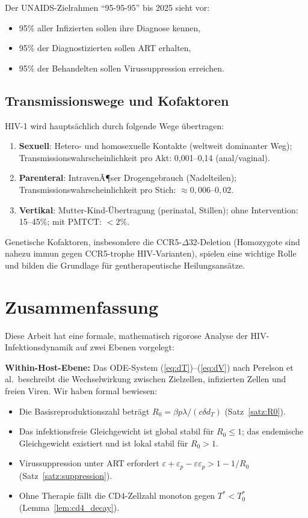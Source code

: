 ﻿\documentclass[a4paper,12pt]{article}
\theoremstyle{definition}
\begin{document}
Der UNAIDS-Zielrahmen ``95-95-95'' bis 2025 sieht vor:
\begin{itemize}
\item 95\% aller Infizierten sollen ihre Diagnose kennen,
\item 95\% der Diagnostizierten sollen ART erhalten,
\item 95\% der Behandelten sollen Virussuppression erreichen.
\end{itemize}

\subsection{Transmissionswege und Kofaktoren}

HIV-1 wird haupts\"achlich durch folgende Wege \"ubertragen:
\begin{enumerate}
\item \textbf{Sexuell}: Hetero- und homosexuelle Kontakte (weltweit dominanter Weg);
      Transmissionswahrscheinlichkeit pro Akt: 0{,}001--0{,}14 (anal/vaginal).
\item \textbf{Parenteral}: IntravenÃ¶ser Drogengebrauch (Nadelteilen);
      Transmissionswahrscheinlichkeit pro Stich: $\approx 0{,}006$--$0{,}02$.
\item \textbf{Vertikal}: Mutter-Kind-\"Ubertragung (perinatal, Stillen);
      ohne Intervention: 15--45\%; mit PMTCT: $< 2\%$.
\end{enumerate}

Genetische Kofaktoren, insbesondere die CCR5-$\Delta$32-Deletion (Homozygote
sind nahezu immun gegen CCR5-trophe HIV-Varianten), spielen eine wichtige Rolle
und bilden die Grundlage f\"ur gentherapeutische Heilungsans\"atze.

\section{Zusammenfassung}

Diese Arbeit hat eine formale, mathematisch rigorose Analyse der HIV-Infektionsdynamik
auf zwei Ebenen vorgelegt:

\textbf{Within-Host-Ebene:} Das ODE-System (\ref{eq:dT})--(\ref{eq:dV}) nach Perelson
et al.\ beschreibt die Wechselwirkung zwischen Zielzellen, infizierten Zellen und
freien Viren. Wir haben formal bewiesen:
\begin{itemize}
\item Die Basisreproduktionszahl betr\"agt $R_0 = \beta p \lambda / (c \delta d_T)$
      (Satz~\ref{satz:R0}).
\item Das infektionsfreie Gleichgewicht ist global stabil f\"ur $R_0 \leq 1$;
      das endemische Gleichgewicht existiert und ist lokal stabil f\"ur $R_0 > 1$.
\item Virussuppression unter ART erfordert $\varepsilon + \varepsilon_p - \varepsilon\varepsilon_p > 1 - 1/R_0$
      (Satz~\ref{satz:suppression}).
\item Ohne Therapie f\"allt die CD4-Zellzahl monoton gegen $T^* < T_0^*$
      (Lemma~\ref{lem:cd4_decay}).
\end{itemize}
\end{document}
